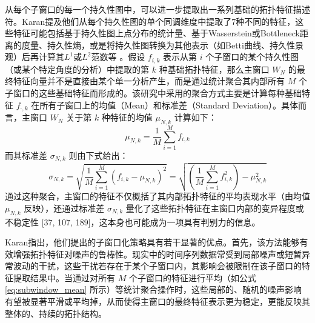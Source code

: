         从每个子窗口的每一个持久性图中，可以进一步提取出一系列基础的拓扑特征描述符。Karan提及他们从每个持久性图的单个同调维度中提取了7种不同的特征，这些特征可能包括基于持久性图上点分布的统计量、基于Wasserstein或Bottleneck距离的度量、持久性熵，或是将持久性图转换为其他表示（如Betti曲线、持久性景观）后再计算其$L^1$或$L^2$范数等 。假设 $f_{i,k}$ 表示从第 $i$ 个子窗口的某个持久性图（或某个特定角度的分析）中提取的第 $k$ 种基础拓扑特征，那么主窗口 $W_N$ 的最终特征向量并不是直接由某个单一分析产生，而是通过统计聚合其内部所有 $M$ 个子窗口的这些基础特征而形成的。该研究中采用的聚合方式主要是计算每种基础特征 $f_{\cdot,k}$ 在所有子窗口上的均值（Mean）和标准差（Standard Deviation）。具体而言，主窗口 $W_N$ 关于第 $k$ 种特征的均值 $\mu_{N,k}$ 计算如下：
        \begin{equation}
            \mu_{N,k} = \frac{1}{M} \sum_{i=1}^{M} f_{i,k}
            \label{eq:subwindow_mean}
        \end{equation}
        而其标准差 $\sigma_{N,k}$ 则由下式给出：
        \begin{equation}
            \sigma_{N,k} = \sqrt{\frac{1}{M}\sum_{i=1}^{M}(f_{i,k} - \mu_{N,k})^2} = \sqrt{\left(\frac{1}{M}\sum_{i=1}^{M}f_{i,k}^2\right) - \mu_{N,k}^2}
            \label{eq:subwindow_std}
        \end{equation}
        通过这种聚合，主窗口的特征不仅概括了其内部拓扑特征的平均表现水平（由均值 $\mu_{N,k}$ 反映），还通过标准差 $\sigma_{N,k}$ 量化了这些拓扑特征在主窗口内部的变异程度或不稳定性 [37, 107, 189]，这本身也可能成为一项具有判别力的信息。
        
        Karan指出，他们提出的子窗口化策略具有若干显著的优点。首先，该方法能够有效增强拓扑特征对噪声的鲁棒性。现实中的时间序列数据常受到局部噪声或短暂异常波动的干扰，这些干扰若存在于某个子窗口内，其影响会被限制在该子窗口的特征提取结果中。当通过对所有 $M$ 个子窗口的特征进行平均（如公式 \ref{eq:subwindow_mean} 所示）等统计聚合操作时，这些局部的、随机的噪声影响有望被显著平滑或平均掉，从而使得主窗口的最终特征表示更为稳定，更能反映其整体的、持续的拓扑结构。
        
